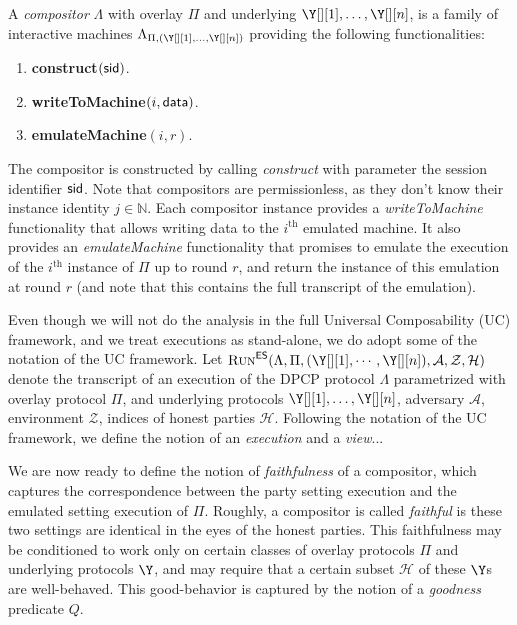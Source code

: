 \begin{definition}[Compositor]
  A \emph{compositor} $\Lambda$ with overlay $\Pi$ and underlying $\Y[][1], \ldots, \Y[][n]$,
  is a family of interactive machines
  $\Lambda_{\Pi,(\Y[][1], \ldots, \Y[][n])}$ providing the following
  functionalities:

  \begin{enumerate}
    \item \textbf{construct}$(\textsf{sid})$.
    \item \textbf{writeToMachine}$(i, \textsf{data})$.
    \item \textbf{emulateMachine}$(i, r)$. %
  \end{enumerate}
\end{definition}

The compositor is constructed by calling \emph{construct} with parameter the session identifier $\textsf{sid}$.
Note that compositors are permissionless, as they don't know their instance identity $j \in \mathbb{N}$.
Each compositor instance provides a \emph{writeToMachine}
functionality that allows writing data to the $i^\text{th}$ emulated machine.
It also provides an \emph{emulateMachine} functionality that promises to emulate the execution of
the $i^\text{th}$ instance of $\Pi$ up to round $r$, and return the instance of this emulation
at round $r$ (and note that this contains the full transcript of the emulation).

Even though we will not do the analysis in the full Universal Composability (UC) framework, and
we treat executions as stand-alone, we do adopt some of the notation of the UC framework.
Let $\LCExec(\Lambda, \Pi, ({\Y[][1]}, \cdots, {\Y[][n]}), \mathcal{A}, \mathcal{Z}, \mathcal{H})$
denote the transcript of an execution of the DPCP protocol $\Lambda$ parametrized with overlay protocol $\Pi$,
and underlying protocols $\Y[][1], \ldots, \Y[][n]$, adversary $\mathcal{A}$, environment $\mathcal{Z}$,
indices of honest parties $\mathcal{H}$.
Following the notation of the UC framework, we define the notion of an \emph{execution}
and a \emph{view}... %

We are now ready to define the notion of \emph{faithfulness} of a
compositor, which captures the
correspondence between the party setting execution and the emulated setting
execution of $\Pi$. Roughly, a compositor is called \emph{faithful} is these
two settings are identical in the eyes of the honest parties.
This faithfulness may be conditioned to work only on certain classes
of overlay protocols $\Pi$ and underlying protocols $\Y$, and may
require that a certain subset $\mathcal{H}$ of these $\Y$s are well-behaved.
This good-behavior is captured by the notion of a \emph{goodness} predicate $Q$.

